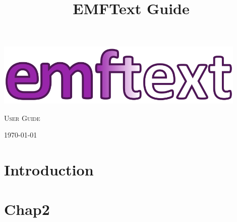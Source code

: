 \documentclass[smallheadings,headsepline,pointlessnumbers,11pt,a4paper]{scrbook}
\title{EMFText Guide}
\let\origdoublepage\cleardoublepage
\renewcommand{\cleardoublepage}{%
  \clearpage{\pagestyle{empty}\origdoublepage}}
\begin{document}
\begin{titlepage}

\hbox{}
\vspace{4cm}

\begin{center}

\includegraphics[width=0.9\textwidth]{../latex/figures/EMFTextLogo.png}


\vspace{3cm}
{
\fontsize{60}{60}
\textsc{User Guide}
}
\end{center}

\vspace{7cm}
\begin{flushright}
\large
\today
\end{flushright}

\end{titlepage}

\cleardoublepage

\tableofcontents

\renewcommand{\listfigurename}{List of Figures}
\listoffigures
\cleardoublepage

\renewcommand{\lstlistlistingname}{List of Listings\vspace{3mm}}
\lstlistoflistings
\cleardoublepage

\mainmatter

\chapter{Introduction}

\chapter{Chap2}

\begin{appendix}

\end{appendix}


\end{document}
